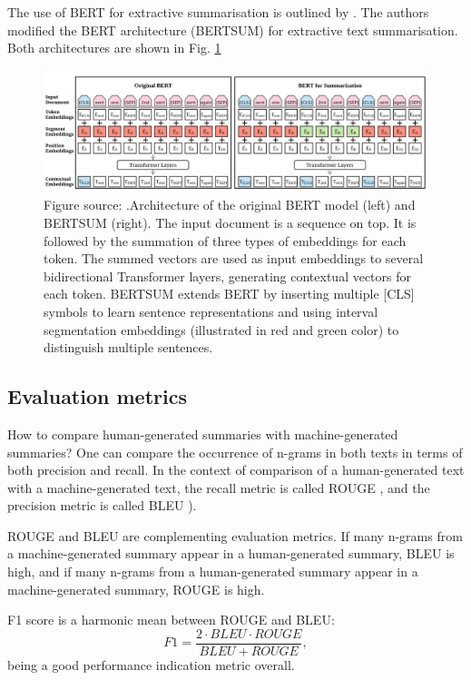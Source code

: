 \documentclass[11pt]{article}
\begin{document}
The use of BERT for extractive summarisation is outlined by \citet{liu2019text}. The authors modified the BERT architecture (BERTSUM) for extractive text summarisation. Both architectures are shown in Fig. \ref{fig:bert}


\begin{figure}[!h]
\centering
\includegraphics[scale = 0.35]{../figures/bert.png}
\caption{Figure source: \citet{liu2019text}.Architecture of the original BERT model (left) and BERTSUM (right). The input document is a sequence on top. It is followed by the summation of three types of embeddings for each token. The summed vectors are used
as input embeddings to several bidirectional Transformer layers, generating contextual vectors for each token. BERTSUM extends BERT by inserting multiple [CLS] symbols to learn sentence representations and using interval segmentation embeddings (illustrated in red and green color) to distinguish multiple sentences.\label{fig:bert}}
\end{figure}


\subsection{Evaluation metrics}

How to compare human-generated summaries with machine-generated summaries? One can compare the occurrence of n-grams \citep{lin2003automatic} in both texts in terms of both precision and recall. In the context of comparison of a human-generated text with a machine-generated text, the recall metric is called ROUGE \citep{lin2003automatic}, and the precision metric is called BLEU \citep{papineni2002bleu}). 

ROUGE and BLEU are complementing evaluation metrics. If many n-grams from a machine-generated summary appear in a human-generated summary, BLEU is high, and if many n-grams from a human-generated summary appear in a machine-generated summary, ROUGE is high.

F1 score is a harmonic mean between ROUGE and BLEU:
\begin{equation}
 F1 = \frac{2\cdot BLEU \cdot ROUGE}{BLEU + ROUGE},
 \label{eq:f1}
\end{equation}
being a good performance indication metric overall.
\end{document}
